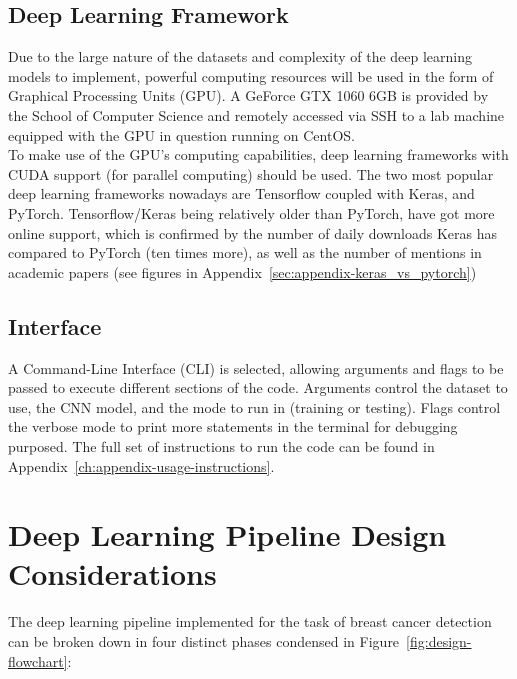 \subsection{Deep Learning Framework}

Due to the large nature of the datasets and complexity of the deep learning models to implement, powerful computing resources will be used in the form of Graphical Processing Units (GPU). A GeForce GTX 1060 6GB is provided by the School of Computer Science and remotely accessed via SSH to a lab machine equipped with the GPU in question running on CentOS.\\

To make use of the GPU's computing capabilities, deep learning frameworks with CUDA support (for parallel computing) should be used. The two most popular deep learning frameworks nowadays are Tensorflow coupled with Keras, and PyTorch. Tensorflow/Keras being relatively older than PyTorch, have got more online support, which is confirmed by the number of daily downloads Keras has compared to PyTorch (ten times more), as well as the number of mentions in academic papers (see figures  in Appendix~\ref{sec:appendix-keras_vs_pytorch})

\subsection{Interface}

A Command-Line Interface (CLI) is selected, allowing arguments and flags to be passed to execute different sections of the code. Arguments control the dataset to use, the CNN model, and the mode to run in (training or testing). Flags control the verbose mode to print more statements in the terminal for debugging purposed. The full set of instructions to run the code can be found in Appendix~\ref{ch:appendix-usage-instructions}.


\section{Deep Learning Pipeline Design Considerations}

The deep learning pipeline implemented for the task of breast cancer detection can be broken down in four distinct phases condensed in Figure~\ref{fig:design-flowchart}:

